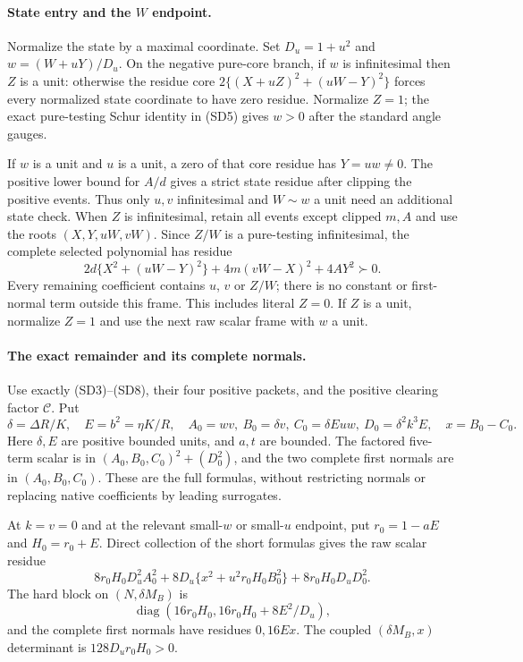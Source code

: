 \paragraph{State entry and the $W$ endpoint.}
Normalize the state by a maximal coordinate. Set
$D_u=1+u^2$ and $w=(W+uY)/D_u$. On the negative pure-core branch,
if $w$ is infinitesimal then $Z$ is a unit: otherwise the residue core
$2\{(X+uZ)^2+(uW-Y)^2\}$ forces every normalized state coordinate
to have zero residue. Normalize $Z=1$; the exact pure-testing Schur
identity in (SD5) gives $w>0$ after the standard angle gauges.

If $w$ is a unit and $u$ is a unit, a zero of that core residue has
$Y=uw\ne0$. The positive lower bound for $A/d$ gives a strict state
residue after clipping the positive events. Thus only $u,v$
infinitesimal and $W\sim w$ a unit need an additional state check.
When $Z$ is infinitesimal, retain all events except clipped $m,A$ and
use the roots $(X,Y,uW,vW)$. Since $Z/W$ is a pure-testing
infinitesimal, the complete selected polynomial has residue
\[
 2d\{X^2+(uW-Y)^2\}+4m(vW-X)^2+4AY^2\succ0.
 \tag{BE4}
\]
Every remaining coefficient contains $u$, $v$ or $Z/W$; there is no
constant or first-normal term outside this frame. This includes
literal $Z=0$. If $Z$ is a unit, normalize $Z=1$ and use the next
raw scalar frame with $w$ a unit.

\paragraph{The exact remainder and its complete normals.}
Use exactly (SD3)--(SD8), their four positive packets, and the positive
clearing factor $\mathcal C$. Put
\[
 \delta=\Delta R/K,\quad E=b^2=\eta K/R,\quad
 A_0=wv,\ B_0=\delta v,\ C_0=\delta Euw,
 \ D_0=\delta^2k^3E,\quad x=B_0-C_0.
\]
Here $\delta,E$ are positive bounded units, and $a,t$ are bounded.
The factored five-term scalar is in
$(A_0,B_0,C_0)^2+(D_0^2)$, and the two complete first normals are
in $(A_0,B_0,C_0)$. These are the full formulas, without restricting
normals or replacing native coefficients by leading surrogates.

At $k=v=0$ and at the relevant small-$w$ or small-$u$ endpoint, put
$r_0=1-aE$ and $H_0=r_0+E$. Direct collection of the short formulas
gives the raw scalar residue
\[
 8r_0H_0D_u^2 A_0^2+
 8D_u\{x^2+u^2r_0H_0B_0^2\}+8r_0H_0D_uD_0^2.
 \tag{BE5}
\]
The hard block on $(N,\delta M_B)$ is
\[
 \operatorname{diag}(16r_0H_0,16r_0H_0+8E^2/D_u),
\]
and the complete first normals have residues $0,16Ex$.
The coupled $(\delta M_B,x)$ determinant is
$128D_ur_0H_0>0$.

